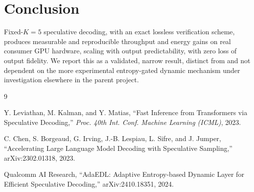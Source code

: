 \documentclass[conference]{IEEEtran}
\begin{document}
\section{Conclusion}

Fixed-$K{=}5$ speculative decoding, with an exact lossless verification
scheme, produces measurable and reproducible throughput and energy gains
on real consumer GPU hardware, scaling with output predictability, with
zero loss of output fidelity. We report this as a validated, narrow result,
distinct from and not dependent on the more experimental entropy-gated
dynamic mechanism under investigation elsewhere in the parent project.


\begin{thebibliography}{9}

Y. Leviathan, M. Kalman, and Y. Matias,
``Fast Inference from Transformers via Speculative Decoding,''
\emph{Proc. 40th Int. Conf. Machine Learning (ICML)}, 2023.

C. Chen, S. Borgeaud, G. Irving, J.-B. Lespiau, L. Sifre, and J. Jumper,
``Accelerating Large Language Model Decoding with Speculative Sampling,''
arXiv:2302.01318, 2023.

Qualcomm AI Research,
``AdaEDL: Adaptive Entropy-based Dynamic Layer for Efficient Speculative Decoding,''
arXiv:2410.18351, 2024.

\end{thebibliography}
\end{document}
